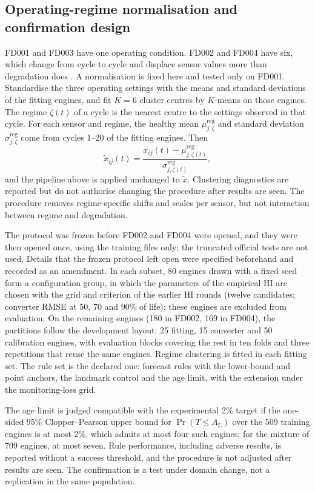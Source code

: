 \documentclass[preprint,12pt]{elsarticle}
\begin{document}
\subsection{Operating-regime normalisation and confirmation design}\label{sec:confirmation-design}


FD001 and FD003 have one operating condition. FD002 and FD004 have six, which change from cycle to cycle and displace sensor values more than degradation does \cite{Saxena2008}. A normalisation is fixed here and tested only on FD001. Standardise the three operating settings with the means and standard deviations of the fitting engines, and fit $K=6$ cluster centres by $K$-means on those engines. The regime $\zeta(t)$ of a cycle is the nearest centre to the settings observed in that cycle. For each sensor and regime, the healthy mean $\mu^{\mathrm{reg}}_{j,\zeta}$ and standard deviation $\sigma^{\mathrm{reg}}_{j,\zeta}$ come from cycles 1--20 of the fitting engines. Then
\[
\tilde x_{ij}(t)=\frac{x_{ij}(t)-\mu^{\mathrm{reg}}_{j,\zeta(t)}}{\sigma^{\mathrm{reg}}_{j,\zeta(t)}},
\]
and the pipeline above is applied unchanged to $\tilde x$. Clustering diagnostics are reported but do not authorise changing the procedure after results are seen. The procedure removes regime-specific shifts and scales per sensor, but not interaction between regime and degradation.

The protocol was frozen before FD002 and FD004 were opened, and they were then opened once, using the training files only; the truncated official tests are not used. Details that the frozen protocol left open were specified beforehand and recorded as an amendment. In each subset, 80 engines drawn with a fixed seed form a configuration group, in which the parameters of the empirical HI are chosen with the grid and criterion of the earlier HI rounds (twelve candidates; converter RMSE at 50, 70 and 90\% of life); these engines are excluded from evaluation. On the remaining engines (180 in FD002, 169 in FD004), the partitions follow the development layout: 25 fitting, 15 converter and 50 calibration engines, with evaluation blocks covering the rest in ten folds and three repetitions that reuse the same engines. Regime clustering is fitted in each fitting set. The rule set is the declared one: forecast rules with the lower-bound and point anchors, the landmark control and the age limit, with the extension under the monitoring-loss grid.

The age limit is judged compatible with the experimental 2\% target if the one-sided 95\% Clopper--Pearson upper bound for $\Pr(T\leq A_{\mathrm L})$ over the 509 training engines is at most 2\%, which admits at most four such engines; for the mixture of 709 engines, at most seven. Rule performance, including adverse results, is reported without a success threshold, and the procedure is not adjusted after results are seen. The confirmation is a test under domain change, not a replication in the same population.
\end{document}
